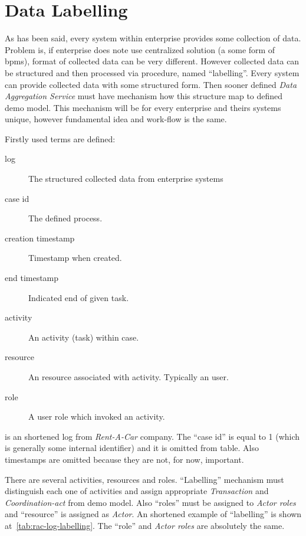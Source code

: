 \section{Data Labelling}
As has been said, every system within enterprise provides some collection of data. Problem is, if enterprise does note use centralized solution (a some form of \gls{bpms}), format of collected data can be very different. 
However collected data can be structured and then processed via procedure, named ``labelling''. Every system can provide collected data with some structured form. Then sooner defined \textit{Data Aggregation Service} must have mechanism how this structure map to defined \gls{demo} model. This mechanism will be for every enterprise and theirs systems unique, however fundamental idea and work-flow is the same.

Firstly used terms are defined:
\begin{description}
\item[log] The structured collected data from enterprise systems
\item[case id] The defined process.
\item[creation timestamp] Timestamp when created.
\item[end timestamp] Indicated end of given task.
\item[activity] An activity (task) within case.
\item[resource] An resource associated with activity. Typically an user.
\item[role] A user role which invoked an activity.
\end{description}

 is an shortened log from \textit{Rent-A-Car} company. The ``case id'' is equal to 1 (which is generally some internal identifier) and it is omitted from table. Also timestamps are omitted because they are not, for now, important.  

There are several activities, resources and roles. ``Labelling'' mechanism must distinguish each one of activities and assign appropriate \textit{Transaction} and \textit{Coordination-act} from \gls{demo} model. Also ``roles'' must be assigned to \textit{Actor roles} and ``resource'' is assigned as \textit{Actor}. An shortened example of ``labelling'' is shown at~\cref{tab:rac-log-labelling}. The ``role'' and \textit{Actor roles} are absolutely the same. 

